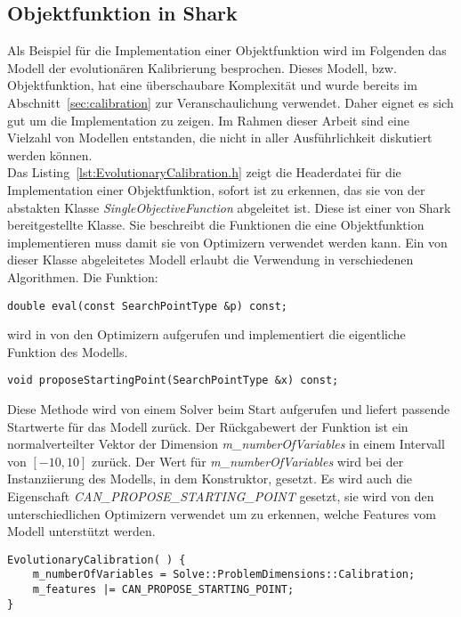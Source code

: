 \subsection{Objektfunktion in Shark}
%
Als Beispiel für die Implementation einer Objektfunktion wird im Folgenden das Modell der evolutionären Kalibrierung besprochen. Dieses Modell, bzw. Objektfunktion, hat eine überschaubare Komplexität und wurde bereits im Abschnitt~\ref{sec:calibration} zur Veranschaulichung verwendet. Daher eignet es sich gut um die Implementation zu zeigen. Im Rahmen dieser Arbeit sind eine Vielzahl von Modellen entstanden, die nicht in aller Ausführlichkeit diskutiert werden können.\\
%
Das Listing~\ref{lst:EvolutionaryCalibration.h} zeigt die Headerdatei für die Implementation einer Objektfunktion, sofort ist zu erkennen, das sie von der abstakten Klasse \textit{SingleObjectiveFunction} abgeleitet ist. Diese ist einer von Shark bereitgestellte Klasse. Sie beschreibt die Funktionen die eine Objektfunktion implementieren muss damit sie von Optimizern verwendet werden kann. Ein von dieser Klasse abgeleitetes Modell erlaubt die Verwendung in verschiedenen Algorithmen. Die Funktion:
%
\begin{lstlisting}
double eval(const SearchPointType &p) const;
\end{lstlisting}
%
wird in von den Optimizern aufgerufen und implementiert die eigentliche Funktion des Modells.
%
\begin{lstlisting}[label=EvolutionaryCalibration_2]
void proposeStartingPoint(SearchPointType &x) const;
\end{lstlisting}
%
Diese Methode wird von einem Solver beim Start aufgerufen und liefert passende Startwerte für das Modell zurück. Der Rückgabewert der Funktion ist ein normalverteilter Vektor der Dimension \textit{m\_numberOfVariables} in einem Intervall von $[-10,10]$ zurück. Der Wert für \textit{m\_numberOfVariables} wird bei der Instanziierung des Modells, in dem Konstruktor, gesetzt. Es wird auch die Eigenschaft \textit{CAN\_PROPOSE\_STARTING\_POINT} gesetzt, sie wird von den unterschiedlichen Optimizern verwendet um zu erkennen, welche Features vom Modell unterstützt werden.
%
\begin{lstlisting}[label=EvolutionaryCalibration_3]
EvolutionaryCalibration( ) {
	m_numberOfVariables = Solve::ProblemDimensions::Calibration;
	m_features |= CAN_PROPOSE_STARTING_POINT;
}
\end{lstlisting}	
